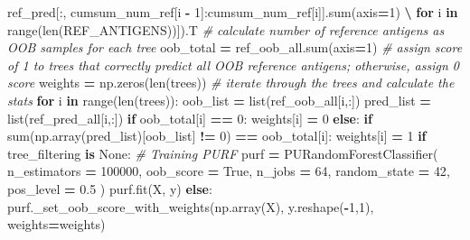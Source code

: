 \documentclass[
  11pt,
  oneside]{book}
\newenvironment{Shaded}{\begin{snugshade}}{\end{snugshade}}
\newcommand{\BuiltInTok}[1]{#1}
\newcommand{\CommentTok}[1]{\textcolor[rgb]{0.56,0.35,0.01}{\textit{#1}}}
\newcommand{\ControlFlowTok}[1]{\textcolor[rgb]{0.13,0.29,0.53}{\textbf{#1}}}
\newcommand{\DecValTok}[1]{\textcolor[rgb]{0.00,0.00,0.81}{#1}}
\newcommand{\FloatTok}[1]{\textcolor[rgb]{0.00,0.00,0.81}{#1}}
\newcommand{\KeywordTok}[1]{\textcolor[rgb]{0.13,0.29,0.53}{\textbf{#1}}}
\newcommand{\NormalTok}[1]{#1}
\newcommand{\OperatorTok}[1]{\textcolor[rgb]{0.81,0.36,0.00}{\textbf{#1}}}
\newcommand{\VariableTok}[1]{\textcolor[rgb]{0.00,0.00,0.00}{#1}}
\begin{document}
\begin{Shaded}
\begin{Highlighting}[]
\NormalTok{                                 ref\_pred[:, cumsum\_num\_ref[i }\OperatorTok{{-}} \DecValTok{1}\NormalTok{]:cumsum\_num\_ref[i]].}\BuiltInTok{sum}\NormalTok{(axis}\OperatorTok{=}\DecValTok{1}\NormalTok{) }\OperatorTok{\textbackslash{}}
                                 \ControlFlowTok{for}\NormalTok{ i }\KeywordTok{in} \BuiltInTok{range}\NormalTok{(}\BuiltInTok{len}\NormalTok{(REF\_ANTIGENS))]).T}
        \CommentTok{\# calculate number of reference antigens as OOB samples for each tree}
\NormalTok{        oob\_total }\OperatorTok{=}\NormalTok{ ref\_oob\_all.}\BuiltInTok{sum}\NormalTok{(axis}\OperatorTok{=}\DecValTok{1}\NormalTok{)}
        \CommentTok{\# assign score of 1 to trees that correctly predict all OOB reference antigens; otherwise, assign 0 score }
\NormalTok{        weights }\OperatorTok{=}\NormalTok{ np.zeros(}\BuiltInTok{len}\NormalTok{(trees))}
        \CommentTok{\# iterate through the trees and calculate the stats}
        \ControlFlowTok{for}\NormalTok{ i }\KeywordTok{in} \BuiltInTok{range}\NormalTok{(}\BuiltInTok{len}\NormalTok{(trees)):}
\NormalTok{            oob\_list }\OperatorTok{=} \BuiltInTok{list}\NormalTok{(ref\_oob\_all[i,:])}
\NormalTok{            pred\_list }\OperatorTok{=} \BuiltInTok{list}\NormalTok{(ref\_pred\_all[i,:])}
            \ControlFlowTok{if}\NormalTok{ oob\_total[i] }\OperatorTok{==} \DecValTok{0}\NormalTok{:}
\NormalTok{                weights[i] }\OperatorTok{=} \DecValTok{0}
            \ControlFlowTok{else}\NormalTok{:}
                \ControlFlowTok{if} \BuiltInTok{sum}\NormalTok{(np.array(pred\_list)[oob\_list] }\OperatorTok{!=} \DecValTok{0}\NormalTok{) }\OperatorTok{==}\NormalTok{ oob\_total[i]:}
\NormalTok{                    weights[i] }\OperatorTok{=} \DecValTok{1}
    \ControlFlowTok{if}\NormalTok{ tree\_filtering }\KeywordTok{is} \VariableTok{None}\NormalTok{:}
        \CommentTok{\# Training PURF}
\NormalTok{        purf }\OperatorTok{=}\NormalTok{ PURandomForestClassifier(}
\NormalTok{            n\_estimators }\OperatorTok{=} \DecValTok{100000}\NormalTok{,}
\NormalTok{            oob\_score }\OperatorTok{=} \VariableTok{True}\NormalTok{,}
\NormalTok{            n\_jobs }\OperatorTok{=} \DecValTok{64}\NormalTok{,}
\NormalTok{            random\_state }\OperatorTok{=} \DecValTok{42}\NormalTok{,}
\NormalTok{            pos\_level }\OperatorTok{=} \FloatTok{0.5}
\NormalTok{        )}
\NormalTok{        purf.fit(X, y)}
    \ControlFlowTok{else}\NormalTok{: }
\NormalTok{        purf.\_set\_oob\_score\_with\_weights(np.array(X), y.reshape(}\OperatorTok{{-}}\DecValTok{1}\NormalTok{,}\DecValTok{1}\NormalTok{), weights}\OperatorTok{=}\NormalTok{weights)}

\end{Highlighting}
\end{Shaded}
\end{document}

